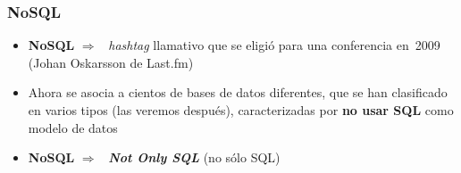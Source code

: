 \documentclass[14pt]{beamer}
\newcommand{\ra}{{\color{blue} $\Rightarrow${}~{}}}
\begin{document}
\begin{frame}
  \frametitle{NoSQL}
\begin{itemize}
\item {\bf NoSQL} \ra{} {\em hashtag\/} llamativo que se
  eligió para una conferencia en~2009 (Johan Oskarsson de Last.fm)
\item Ahora se asocia a cientos de bases de datos diferentes,
  que se han clasificado en varios tipos (las veremos después),
  caracterizadas por {\bf no usar SQL} como modelo de datos
\item {\bf NoSQL} \ra{} {\bfseries\itshape Not Only SQL} (no sólo SQL)
  \end{itemize}
\end{frame}



\end{document}
